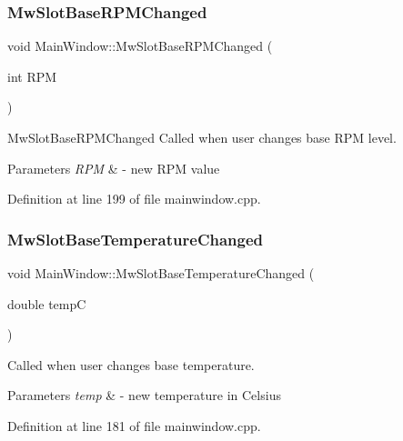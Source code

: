 \subsubsection{\texorpdfstring{Mw\+Slot\+Base\+R\+P\+M\+Changed}{MwSlotBaseRPMChanged}}
{\footnotesize\ttfamily void Main\+Window\+::\+Mw\+Slot\+Base\+R\+P\+M\+Changed (\begin{DoxyParamCaption}\item[{int}]{R\+PM }\end{DoxyParamCaption})\hspace{0.3cm}{\ttfamily [slot]}}



Mw\+Slot\+Base\+R\+P\+M\+Changed Called when user changes base R\+PM level. 


\begin{DoxyParams}{Parameters}
{\em R\+PM} & -\/ new R\+PM value \\
\hline
\end{DoxyParams}


Definition at line 199 of file mainwindow.\+cpp.

\mbox{\label{class_main_window_a0a690287dffb47b6477f2fb50c2a818e}} 
\subsubsection{\texorpdfstring{Mw\+Slot\+Base\+Temperature\+Changed}{MwSlotBaseTemperatureChanged}}
{\footnotesize\ttfamily void Main\+Window\+::\+Mw\+Slot\+Base\+Temperature\+Changed (\begin{DoxyParamCaption}\item[{double}]{tempC }\end{DoxyParamCaption})\hspace{0.3cm}{\ttfamily [slot]}}



Called when user changes base temperature. 


\begin{DoxyParams}{Parameters}
{\em temp} & -\/ new temperature in Celsius \\
\hline
\end{DoxyParams}


Definition at line 181 of file mainwindow.\+cpp.

